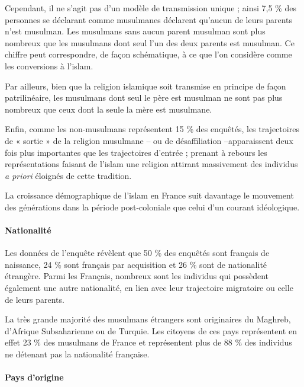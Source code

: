 Cependant, il ne s'agit pas d'un modèle de transmission unique ; ainsi
7,5 \% des personnes se déclarant comme musulmanes déclarent qu'aucun de
leurs parents n'est musulman. Les musulmans sans aucun parent musulman
sont plus nombreux que les musulmans dont seul l'un des deux parents est
musulman. Ce chiffre peut correspondre, de façon schématique, à ce que
l'on considère comme les conversions à l'islam.

Par ailleurs, bien que la religion islamique soit transmise en principe
de façon patrilinéaire, les musulmans dont seul le père est musulman ne
sont pas plus nombreux que ceux dont la seule la mère est musulmane.

Enfin, comme les non-musulmans représentent 15 \% des enquêtés, les
trajectoires de « sortie » de la religion musulmane -- ou de
désaffiliation --apparaissent deux fois plus importantes que les
trajectoires d'entrée ; prenant à rebours les représentations faisant de
l'islam une religion attirant massivement des individus \emph{a priori}
éloignés de cette tradition.

La croissance démographique de l'islam en France suit davantage le
mouvement des générations dans la période post-coloniale que celui d'un
courant idéologique.



\paragraph{Nationalité}

Les données de l'enquête révèlent que 50 \% des enquêtés sont français
de naissance, 24 \% sont français par acquisition et 26 \% sont de
nationalité étrangère. Parmi les Français, nombreux sont les individus
qui possèdent également une autre nationalité, en lien avec leur
trajectoire migratoire ou celle de leurs parents.

La très grande majorité des musulmans étrangers sont originaires du
Maghreb, d'Afrique Subsaharienne ou de Turquie. Les citoyens de ces pays
représentent en effet 23 \% des musulmans de France et représentent plus
de 88 \% des individus ne détenant pas la nationalité française.





\paragraph{Pays d'origine}



